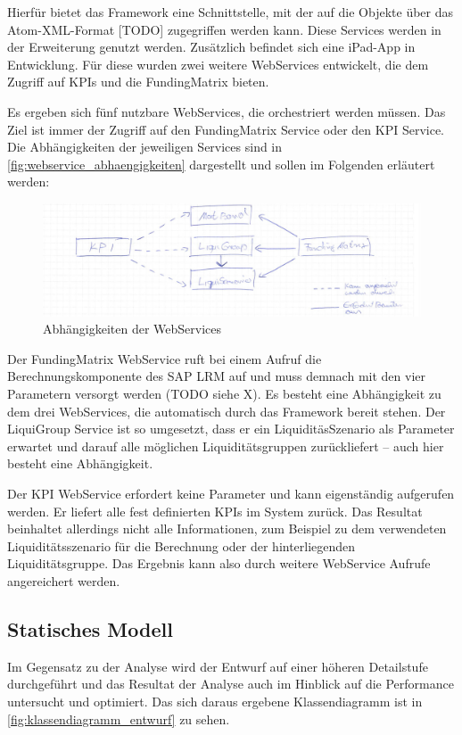 Hierfür bietet das Framework eine Schnittstelle, mit der auf die Objekte über das Atom-XML-Format [TODO] zugegriffen werden kann. Diese Services werden in der Erweiterung genutzt werden. Zusätzlich befindet sich eine iPad-App in Entwicklung. Für diese wurden zwei weitere WebServices entwickelt, die dem Zugriff auf KPIs und die FundingMatrix bieten.

Es ergeben sich fünf nutzbare WebServices, die orchestriert werden müssen. Das Ziel ist immer der Zugriff auf den FundingMatrix Service oder den KPI Service. Die Abhängigkeiten der jeweiligen Services sind in \vref{fig:webservice_abhaengigkeiten} dargestellt und sollen im Folgenden erläutert werden:

\begin{figure}[h]
\centering
\setlength{\unitlength}{1mm}
\includegraphics[width=15cm]{images/WebService-Abhaengigkeiten.jpg}
\caption{Abhängigkeiten der WebServices\label{fig:webservice_abhaengigkeiten}}
\end{figure}


Der FundingMatrix WebService ruft bei einem Aufruf die Berechnungskomponente des SAP LRM auf und muss demnach mit den vier Parametern versorgt werden (TODO siehe X). Es besteht eine Abhängigkeit zu dem drei WebServices, die automatisch durch das Framework  bereit stehen. Der LiquiGroup Service ist so umgesetzt, dass er ein LiquiditäsSzenario als Parameter erwartet und darauf alle möglichen Liquiditätsgruppen zurückliefert -- auch hier besteht eine Abhängigkeit.

Der KPI WebService erfordert keine Parameter und kann eigenständig aufgerufen werden. Er liefert alle fest definierten KPIs im System zurück. Das Resultat beinhaltet allerdings nicht alle Informationen, zum Beispiel zu dem verwendeten Liquiditätsszenario für die Berechnung oder der hinterliegenden Liquiditätsgruppe. Das Ergebnis kann also durch weitere WebService Aufrufe angereichert werden.

\subsection{Statisches Modell}
Im Gegensatz zu der Analyse wird der Entwurf auf einer höheren Detailstufe durchgeführt und das Resultat der Analyse auch im Hinblick auf die Performance untersucht und optimiert. Das sich daraus ergebene Klassendiagramm ist in \vref{fig:klassendiagramm_entwurf} zu sehen.


